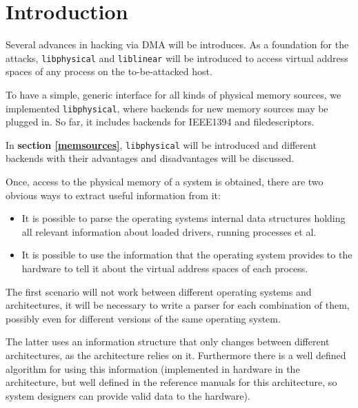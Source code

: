 %
%

\section{Introduction}

Several advances in hacking via DMA will be introduces. As a foundation for the
attacks, \texttt{libphysical} and \texttt{liblinear} will be introduced to
access virtual address spaces of any process on the to-be-attacked host.



To have a simple, generic interface for all kinds of physical memory sources, we
implemented \texttt{libphysical}, where backends for new memory sources may be
plugged in. So far, it includes backends for IEEE1394 and filedescriptors.

In \textbf{section \ref{memsources}}, \texttt{libphysical} will be introduced
and different backends with their advantages and disadvantages will be
discussed.



Once, access to the physical memory of a system is obtained, there are two
obvious ways to extract useful information from it:

\begin{itemize}

	\item It is possible to parse the operating systems internal data
	structures holding all relevant information about loaded drivers,
	running processes et al.
	
	\item It is possible to use the information that the operating system
	provides to the hardware to tell it about the virtual address spaces of
	each process.
	
\end{itemize}

The first scenario will not work between different operating systems and
architectures, it will be necessary to write a parser for each combination of
them, possibly even for different versions of the same operating system.

The latter uses an information structure that only changes between different
architectures, as the architecture relies on it. Furthermore there is a well
defined algorithm for using this information (implemented in hardware in the
architecture, but well defined in the reference manuals for this architecture,
so system designers can provide valid data to the hardware).

